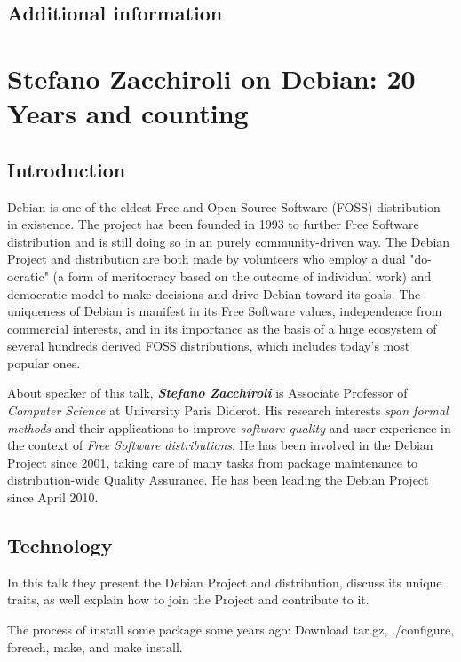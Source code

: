 \documentclass[11pt]{article}
\begin{document}
\subsection{Additional information}

\newpage

\section{Stefano Zacchiroli on Debian: 20 Years and counting}

\subsection{Introduction}
Debian is one of the eldest Free and Open Source Software (FOSS) distribution in existence. The project has been founded in 1993 to further Free Software distribution and is still doing so in an purely community-driven way. The Debian Project and distribution are both made by volunteers who employ a dual "do-ocratic" (a form of meritocracy based on the outcome of individual work) and democratic model to make decisions and drive Debian toward its goals. The uniqueness of Debian is manifest in its Free Software values, independence from commercial interests, and in its importance as the basis of a huge ecosystem of several hundreds derived FOSS distributions, which includes today's most popular ones. 

About speaker of this talk, \emph{\textbf{Stefano Zacchiroli}} is Associate Professor of \emph{Computer Science} at University Paris Diderot. His research interests \emph{span formal methods} and their applications to improve \emph{software quality} and user experience in the context of \emph{Free Software distributions}. He has been involved in the Debian Project since 2001, taking care of many tasks from package maintenance to distribution-wide Quality Assurance. He has been leading the Debian Project since April 2010.

\subsection{Technology}
In this talk they present the Debian Project and distribution, discuss its unique traits, as well explain how to join the Project and contribute to it.

The process of install some package some years ago: Download tar.gz, ./configure, foreach, make, and make install.
\end{document}
